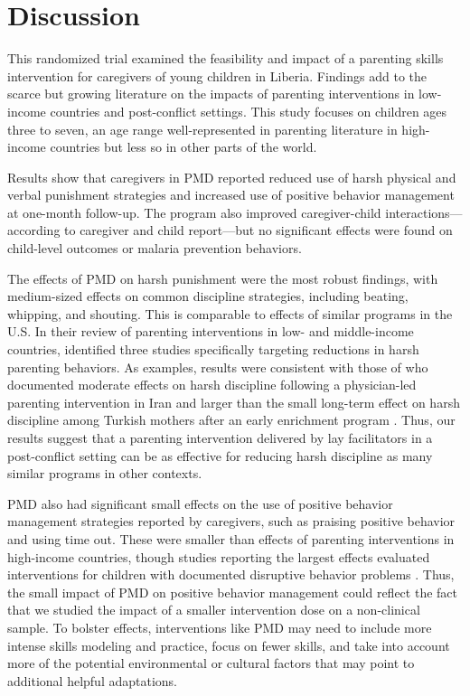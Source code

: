 \documentclass[12pt,authoryear]{elsarticle}\usepackage{knitr}
\begin{document}
\section*{Discussion}

This randomized trial examined the feasibility and impact of a parenting skills intervention for caregivers of young children in Liberia. Findings add to the scarce but growing literature on the impacts of parenting interventions in low-income countries and post-conflict settings. This study focuses on children ages three to seven, an age range well-represented in parenting literature in high-income countries but less so in other parts of the world. 

Results show that caregivers in PMD reported reduced use of harsh physical and verbal punishment strategies and increased use of positive behavior management at one-month follow-up. The program also improved caregiver-child interactions---according to caregiver and child report---but no significant effects were found on child-level outcomes or malaria prevention behaviors. 
 
The effects of PMD on harsh punishment were the most robust findings, with medium-sized effects on common discipline strategies, including beating, whipping, and shouting. This is comparable to effects of similar programs in the U.S. In their review of parenting interventions in low- and middle-income countries, \citet{Knerr:2013} identified three studies specifically targeting reductions in harsh parenting behaviors. As examples, results were consistent with those of \citet{Oveisi:2010} who documented moderate effects on harsh discipline following a physician-led parenting intervention in Iran and larger than the small long-term effect on harsh discipline among Turkish mothers after an early enrichment program \citet{Kagitcibasi:2001}. Thus, our results suggest that a parenting intervention delivered by lay facilitators in a post-conflict setting can be as effective for reducing harsh discipline as many similar programs in other contexts.

PMD also had significant small effects on the use of positive behavior management strategies reported by caregivers, such as praising positive behavior and using time out. These were smaller than effects of parenting interventions in high-income countries, though studies reporting the largest effects evaluated interventions for children with documented disruptive behavior problems \citep{Thomas:2007}. Thus, the small impact of PMD on positive behavior management could reflect the fact that we studied the impact of a smaller intervention dose on a non-clinical sample. To bolster effects, interventions like PMD may need to include more intense skills modeling and practice, focus on fewer skills, and take into account more of the potential environmental or cultural factors that may point to additional helpful adaptations. 
\end{document}
